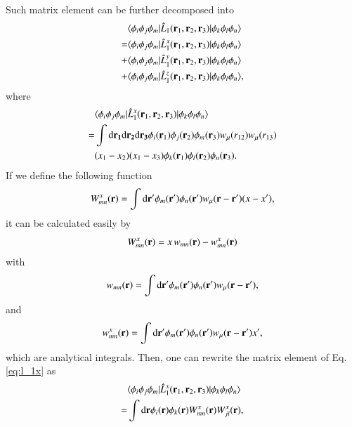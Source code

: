 \documentclass[aip,jcp,reprint,noshowkeys,superscriptaddress,twocolumn]{revtex4-1}
\newcommand{\matelem}[3]{\langle #1 | #2 | #3 \rangle}
\newcommand{\bri}[1]{{\bf r}_{#1}}
\newcommand{\dr}[1]{\text{d}{\bf r_{#1}}}
\begin{document}
Such matrix element can be further decomposed into
\begin{equation}
 \begin{aligned}
 &  \matelem{\phi_i \phi_j \phi_m}{\hat{L}_1(\bri{1},\bri{2},\bri{3})}{\phi_k \phi_l \phi_n}  \\
 =& \matelem{\phi_i \phi_j \phi_m}{\hat{L}_1^x(\bri{1},\bri{2},\bri{3})}{\phi_k \phi_l \phi_n} \\  
+ & \matelem{\phi_i \phi_j \phi_m}{\hat{L}_1^y(\bri{1},\bri{2},\bri{3})}{\phi_k \phi_l \phi_n} \\  
+ & \matelem{\phi_i \phi_j \phi_m}{\hat{L}_1^z(\bri{1},\bri{2},\bri{3})}{\phi_k \phi_l \phi_n},  
 \end{aligned}
\end{equation}
where 
\begin{equation}
 \begin{aligned}
 \label{eq:l_1x}
& \matelem{\phi_i \phi_j \phi_m}{\hat{L}_1^x(\bri{1},\bri{2},\bri{3})}{\phi_k \phi_l \phi_n} \\  
 = & \int \dr{1} \dr{2} \dr{3} \phi_i(\bri{1}) \phi_j(\bri{2}) \phi_m(\bri{3}) w_{\mu}(r_{12}) w_{\mu}(r_{13}) \\ 
 &(x_1 - x_2) (x_1 - x_3) \phi_k(\bri{1}) \phi_l(\bri{2}) \phi_n(\bri{3}).
 \end{aligned}
\end{equation}
If we define the following function 
\begin{equation}
 W_{mn}^x({\bf r})  = \int \text{d}{\bf r'} \phi_m({\bf r}') \phi_n({\bf r}') w_{\mu}({\bf r} - {\bf r'}) (x - x'),  
\end{equation}
it can be calculated easily by
\begin{equation}
 W_{mn}^x({\bf r})  = x \, w_{mn}({\bf r}) - w_{mn}^x({\bf r})
\end{equation}
with 
\begin{equation}
 w_{mn}({\bf r}) = \int \text{d}{\bf r'} \phi_m({\bf r}') \phi_n({\bf r}') w_{\mu}({\bf r} - {\bf r'}), 
\end{equation}
and 
\begin{equation}
  w_{mn}^x({\bf r}) = \int \text{d}{\bf r'} \phi_m({\bf r}') \phi_n({\bf r}') w_{\mu}({\bf r} - {\bf r'})  x',
\end{equation}
which are analytical integrals.  
Then, one can rewrite the matrix element of Eq. \eqref{eq:l_1x} as
\begin{equation}
 \begin{aligned}
 \label{eq:l_1x_2}
& \matelem{\phi_i \phi_j \phi_m}{\hat{L}_1^x(\bri{1},\bri{2},\bri{3})}{\phi_k \phi_l \phi_n} \\  
 = & \int \text{d}{\bf r} \phi_i({\bf r})  \phi_k({\bf r}) W_{mn}^x({\bf r}) W_{jl}^x({\bf r}),
 \end{aligned}
\end{equation}
\end{document}
